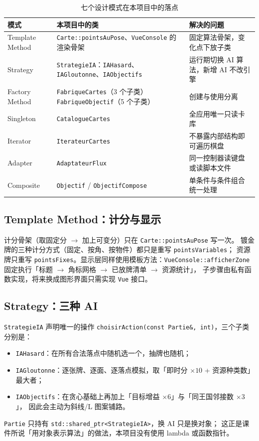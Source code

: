\documentclass[11pt,a4paper]{ctexart}
\newcommand{\cl}[1]{\texttt{#1}}
\begin{document}
\begin{table}[h]
\centering
\small
\begin{tabular}{p{2.8cm}p{5.6cm}p{6.4cm}}
\toprule
模式 & 本项目中的类 & 解决的问题 \\
\midrule
Template Method & \cl{Carte::pointsAuPose}、\cl{VueConsole} 的渲染骨架 & 固定算法骨架，变化点下放子类 \\
Strategy & \cl{StrategieIA}：\cl{IAHasard}、\cl{IAGloutonne}、\cl{IAObjectifs} & 运行期切换 AI 算法，新增 AI 不改引擎 \\
Factory Method & \cl{FabriqueCartes}（3 个子类）\newline \cl{FabriqueObjectif}（5 个子类） & 创建与使用分离 \\
Singleton & \cl{CatalogueCartes} & 全应用唯一只读卡库 \\
Iterator & \cl{IterateurCartes} & 不暴露内部结构即可遍历棋盘 \\
Adapter & \cl{AdaptateurFlux} & 同一控制器读键盘或读脚本文件 \\
Composite & \cl{Objectif} / \cl{ObjectifCompose} & 单条件与条件组合统一处理 \\
\bottomrule
\end{tabular}
\caption{七个设计模式在本项目中的落点}
\label{tab:patterns}
\end{table}

\subsection{Template Method：计分与显示}
计分骨架（取固定分 $\rightarrow$ 加上可变分）只在 \cl{Carte::pointsAuPose} 写一次。
镀金牌的三种计分方式（固定、按角、按物件）都只是重写 \cl{pointsVariables}；
资源牌只重写 \cl{pointsFixes}。显示层同样使用模板方法：\cl{VueConsole::afficherZone}
固定执行「标题 $\rightarrow$ 角标网格 $\rightarrow$ 已放牌清单 $\rightarrow$ 资源统计」，
子步骤由私有函数实现，将来换成图形界面只需实现 \cl{Vue} 接口。

\subsection{Strategy：三种 AI}
\cl{StrategieIA} 声明唯一的操作 \cl{choisirAction(const Partie\&, int)}，三个子类分别是：
\begin{itemize}
\item \cl{IAHasard}：在所有合法落点中随机选一个，抽牌也随机；
\item \cl{IAGloutonne}：逐张牌、逐面、逐落点模拟，取「即时分 $\times 10$ + 资源种类数」最大者；
\item \cl{IAObjectifs}：在贪心基础上再加上「目标增益 $\times 6$」与「同王国邻接数 $\times 3$」，
      因此会主动为斜线/L 图案铺路。
\end{itemize}
\cl{Partie} 只持有 \cl{std::shared\_ptr<StrategieIA>}，换 AI 只是换对象；
这正是课件所说「用对象表示算法」的做法，本项目没有使用 lambda 或函数指针。
\end{document}
